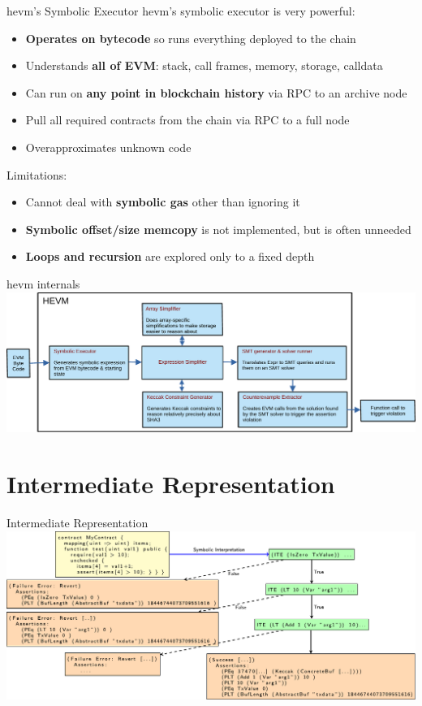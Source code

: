 \documentclass[aspectratio=169]{beamer}
\begin{document}
\begin{frame}{hevm's Symbolic Executor}
hevm's symbolic executor is very powerful:
\begin{itemize}
\item \textbf{Operates on bytecode} so runs everything deployed to the chain
\item Understands \textbf{all of EVM}: stack, call frames, memory, storage, calldata
\item Can run on \textbf{any point in blockchain history} via RPC to an archive node
\item Pull all required contracts from the chain via RPC to a full node
\item Overapproximates unknown code
\end{itemize}
\bigskip

Limitations:
\begin{itemize}
\item Cannot deal with \textbf{symbolic gas} other than ignoring it
\item \textbf{Symbolic offset/size memcopy} is not implemented, but is often unneeded
\item \textbf{Loops and recursion} are explored only to a fixed depth
\end{itemize}
\end{frame}

\begin{frame}{hevm internals}
\centering
\includegraphics[scale=0.6]{hevm-overview}
\end{frame}

\section{Intermediate Representation}
\begin{frame}{Intermediate Representation}
    \centering
    \includegraphics[scale=0.88]{IR}
\end{frame}
\end{document}
